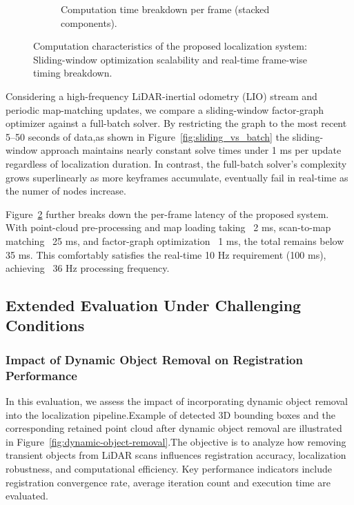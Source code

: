\begin{figure}[H]
\begin{subfigure}[t]{0.48\textwidth}
		\caption{Computation time breakdown per frame (stacked components).}
		\label{fig:computation_summary}
	\end{subfigure}
	\caption{Computation characteristics of the proposed localization system: Sliding-window optimization scalability and real-time frame-wise timing breakdown.}
	\label{fig:computation_summary}
\end{figure}


Considering a high-frequency LiDAR-inertial odometry (LIO) stream and periodic map-matching updates, we compare a sliding-window factor-graph optimizer against a full-batch solver. By restricting the graph to the most recent 5–50 seconds of data,as shown in Figure~\ref{fig:sliding_vs_batch} the sliding-window approach maintains nearly constant solve times under 1 ms per update regardless of localization duration. In contrast, the full-batch solver’s complexity grows superlinearly as more keyframes accumulate, eventually fail in real‐time as the numer of nodes increase.

Figure~\ref{fig:computation_summary} further breaks down the per-frame latency of the proposed system. With point-cloud pre-processing and map loading taking ~2 ms, scan-to-map matching ~25 ms, and factor-graph optimization ~1 ms, the total remains below 35 ms. This comfortably satisfies the real-time 10 Hz requirement (100 ms), achieving ~36 Hz processing frequency.

\subsection{ Extended Evaluation Under Challenging Conditions}


\subsubsection{Impact of Dynamic Object Removal on Registration Performance}

In this evaluation, we assess the impact of incorporating dynamic object removal into the localization pipeline.Example of  detected 3D bounding boxes and the corresponding retained point cloud after dynamic object removal are illustrated in Figure~\ref{fig:dynamic-object-removal}.The objective is to analyze how removing transient objects from LiDAR scans influences registration accuracy, localization robustness, and computational efficiency. Key performance indicators include registration convergence rate, average iteration count and  execution time are evaluated.

